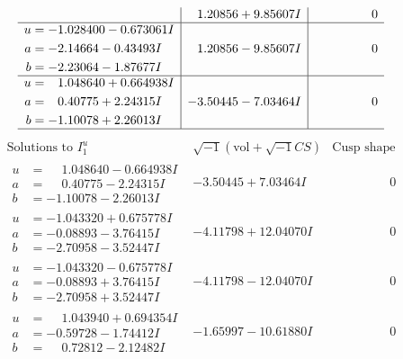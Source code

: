 \documentclass[1p]{elsarticle_modified}
\theoremstyle{definition}
\newcommand{\I}{\sqrt{-1}}
\begin{document}
$$\begin{array}{c|c|c}
 & \phantom{-}1.20856 + 9.85607 I & \phantom{-0.000000 } 0 \\ \hline\begin{aligned}
u &= -1.028400 - 0.673061 I \\
a &= -2.14664 - 0.43493 I \\
b &= -2.23064 - 1.87677 I\end{aligned}
 & \phantom{-}1.20856 - 9.85607 I & \phantom{-0.000000 } 0 \\ \hline\begin{aligned}
u &= \phantom{-}1.048640 + 0.664938 I \\
a &= \phantom{-}0.40775 + 2.24315 I \\
b &= -1.10078 + 2.26013 I\end{aligned}
 & -3.50445 - 7.03464 I & \phantom{-0.000000 } 0\\
 \hline 
 \end{array}$$\newpage$$\begin{array}{c|c|c}  
\text{Solutions to }I^u_{1}& \I (\text{vol} + \sqrt{-1}CS) & \text{Cusp shape}\\
 \hline 
\begin{aligned}
u &= \phantom{-}1.048640 - 0.664938 I \\
a &= \phantom{-}0.40775 - 2.24315 I \\
b &= -1.10078 - 2.26013 I\end{aligned}
 & -3.50445 + 7.03464 I & \phantom{-0.000000 } 0 \\ \hline\begin{aligned}
u &= -1.043320 + 0.675778 I \\
a &= -0.08893 - 3.76415 I \\
b &= -2.70958 - 3.52447 I\end{aligned}
 & -4.11798 + 12.04070 I & \phantom{-0.000000 } 0 \\ \hline\begin{aligned}
u &= -1.043320 - 0.675778 I \\
a &= -0.08893 + 3.76415 I \\
b &= -2.70958 + 3.52447 I\end{aligned}
 & -4.11798 - 12.04070 I & \phantom{-0.000000 } 0 \\ \hline\begin{aligned}
u &= \phantom{-}1.043940 + 0.694354 I \\
a &= -0.59728 - 1.74412 I \\
b &= \phantom{-}0.72812 - 2.12482 I\end{aligned}
 & -1.65997 - 10.61880 I & \phantom{-0.000000 } 0 \\ \hline\begin{aligned}

\end{aligned}
\end{array}$$
\end{document}
